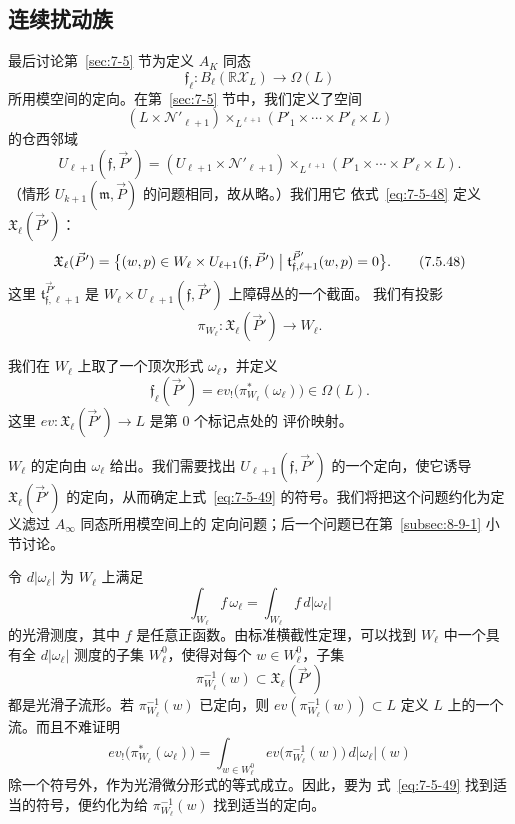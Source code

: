 
\subsection{连续扰动族}
\label{subsec:8-10-3}

最后讨论第~\ref{sec:7-5} 节为定义 $A_K$ 同态
\[
 \mathfrak f_\ell\colon
 B_\ell(\mathbb R\mathcal X_L)\longrightarrow\Omega(L)
\]
所用模空间的定向。在第~\ref{sec:7-5} 节中，我们定义了空间
\[
 (L\times\mathcal N'_{\ell+1})
 \mathbin{\times_{L^{\ell+1}}}
 (P'_1\times\cdots\times P'_\ell\times L)
\]
的仓西邻域
\[
 U_{\ell+1}(\mathfrak f,\vec P')
 = (U_{\ell+1}\times\mathcal N'_{\ell+1})
 \mathbin{\times_{L^{\ell+1}}}
 (P'_1\times\cdots\times P'_\ell\times L).
\]
（情形 $U_{k+1}(\mathfrak m,\vec P)$ 的问题相同，故从略。）我们用它
依式~\eqref{eq:7-5-48} 定义 $\mathfrak X_\ell(\vec P')$：
\begin{equation}
 \mathfrak X_\ell(\vec P')
 =\bigl\{(w,p)\in W_\ell\times
 U_{\ell+1}(\mathfrak f,\vec P')
 \bigm|
 \mathfrak t_{\mathfrak f,\ell+1}^{\vec P'}(w,p)=0
 \bigr\}.
 \tag{7.5.48}
\end{equation}
这里 $\mathfrak t_{\mathfrak f,\ell+1}^{\vec P'}$ 是
$W_\ell\times U_{\ell+1}(\mathfrak f,\vec P')$ 上障碍丛的一个截面。
我们有投影
\[
 \pi_{W_\ell}\colon\mathfrak X_\ell(\vec P')\longrightarrow W_\ell.
\]

我们在 $W_\ell$ 上取了一个顶次形式 $\omega_\ell$，并定义
\begin{equation}
 \mathfrak f_\ell(\vec P')
 =ev_!\bigl(\pi_{W_\ell}^*(\omega_\ell)\bigr)\in\Omega(L).
 \tag{7.5.49}
\end{equation}
这里 $ev\colon\mathfrak X_\ell(\vec P')\to L$ 是第 $0$ 个标记点处的
评价映射。

$W_\ell$ 的定向由 $\omega_\ell$ 给出。我们需要找出
$U_{\ell+1}(\mathfrak f,\vec P')$ 的一个定向，使它诱导
$\mathfrak X_\ell(\vec P')$ 的定向，从而确定上式~\eqref{eq:7-5-49}
的符号。我们将把这个问题约化为定义滤过 $A_\infty$ 同态所用模空间上的
定向问题；后一个问题已在第~\ref{subsec:8-9-1} 小节讨论。

令 $d\lvert\omega_\ell\rvert$ 为 $W_\ell$ 上满足
\[
 \int_{W_\ell}f\,\omega_\ell
 =\int_{W_\ell}f\,d\lvert\omega_\ell\rvert
\]
的光滑测度，其中 $f$ 是任意正函数。由标准横截性定理，可以找到
$W_\ell$ 中一个具有全 $d\lvert\omega_\ell\rvert$ 测度的子集
$W_\ell^0$，使得对每个 $w\in W_\ell^0$，子集
\[
 \pi_{W_\ell}^{-1}(w)\subset\mathfrak X_\ell(\vec P')
\]
都是光滑子流形。若 $\pi_{W_\ell}^{-1}(w)$ 已定向，则
$ev(\pi_{W_\ell}^{-1}(w))\subset L$ 定义 $L$ 上的一个流。而且不难证明
\begin{equation}
 ev_!\bigl(\pi_{W_\ell}^*(\omega_\ell)\bigr)
 =\int_{w\in W_\ell^0}
 ev\bigl(\pi_{W_\ell}^{-1}(w)\bigr)
 \,d\lvert\omega_\ell\rvert(w)
 \tag{8.10.8}\label{eq:8-10-8}
\end{equation}
除一个符号外，作为光滑微分形式的等式成立。因此，要为
式~\eqref{eq:7-5-49} 找到适当的符号，便约化为给
$\pi_{W_\ell}^{-1}(w)$ 找到适当的定向。

